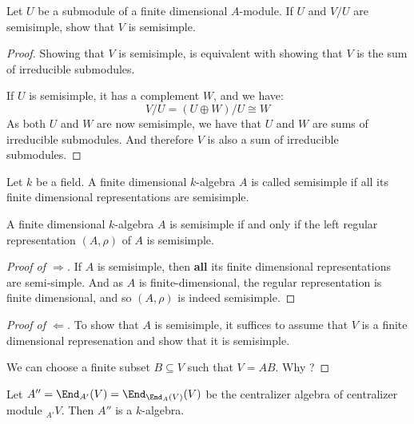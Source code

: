 \begin{prop}
Let \(U\) be a submodule of a finite dimensional \(A\)-module. If \(U\) and \(V/U\) are semisimple, show that \(V\) is semisimple.
\end{prop}

\begin{proof}
Showing that \(V\) is semisimple, is equivalent with showing that \(V\) is the sum of irreducible submodules.

If \(U\) is semisimple, it has a complement \(W\), and we have:
\[
V/U=(U\oplus W)/U \cong W
\]
As both \(U\) and \(W\) are now semisimple, we have that \(U\) and \(W\) are sums of irreducible submodules. And therefore \(V\) is also a sum of irreducible submodules.
\end{proof}

\begin{defn}
Let \(k\) be a field. A finite dimensional \(k\)-algebra \(A\) is called semisimple if all its finite dimensional representations are semisimple.
\end{defn}

\begin{prop}
A finite dimensional \(k\)-algebra \(A\) is semisimple if and only if the left regular representation \((A,\rho )\) of \(A\) is semisimple.
\end{prop}

\begin{proof}
[Proof of \(\Longrightarrow \)] If \(A\) is semisimple, then \textbf{all} its finite dimensional representations are semi-simple. And as \(A\) is finite-dimensional, the regular representation is finite dimensional, and so \((A,\rho )\) is indeed semisimple.
\end{proof}

\begin{proof}
[Proof of \(\Longleftarrow \)] To show that \(A\) is semisimple, it suffices to assume that \(V\) is a finite dimensional represenation and show that it is semisimple.

We can choose a finite subset \(B\subseteq V\) such that \(V=AB\). Why ?
\end{proof}


\begin{prop}
Let \(A''=\End_{A'}(V)=\End_{\End_{A}(V)}(V)\) be the centralizer algebra of centralizer module \(_{A'}V\). Then \(A''\) is a \(k\)-algebra.
\end{prop}

